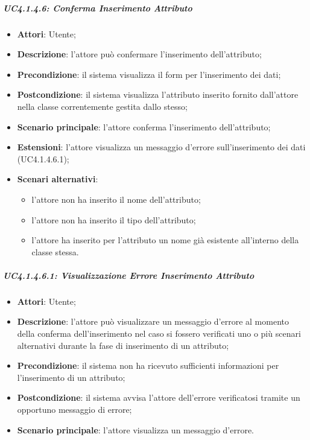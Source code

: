 \subparagraph{UC4.1.4.6: Conferma Inserimento Attributo}
\label{UC4.1.4.6}
\begin{itemize}
\item \textbf{Attori}: Utente;
\item \textbf{Descrizione}: l'attore può confermare l'inserimento dell'attributo;
\item \textbf{Precondizione}: il sistema visualizza il form per l'inserimento dei dati;	
\item \textbf{Postcondizione}: il sistema visualizza l'attributo inserito fornito dall'attore nella classe correntemente gestita dallo stesso;	
\item \textbf{Scenario principale}:
l'attore conferma l'inserimento dell'attributo;	
\item \textbf{Estensioni}:
l'attore visualizza un messaggio d'errore sull'inserimento dei dati (UC4.1.4.6.1);	
\item \textbf{Scenari alternativi}:
\begin{itemize}
	\item l'attore non ha inserito il nome dell'attributo;
	\item l'attore non ha inserito il tipo dell'attributo;
	\item l'attore ha inserito per l'attributo un nome già esistente all'interno della classe stessa.
\end{itemize}
\end{itemize}

\subparagraph{UC4.1.4.6.1: Visualizzazione Errore Inserimento Attributo}
\label{UC4.1.4.6.1}
\begin{itemize}
\item \textbf{Attori}: Utente;
\item \textbf{Descrizione}: l'attore può visualizzare un messaggio d'errore al momento della conferma dell'inserimento nel caso si fossero verificati uno o più scenari alternativi durante la fase di inserimento di un attributo;	
\item \textbf{Precondizione}: il sistema non ha ricevuto sufficienti informazioni per l'inserimento di un attributo;	
\item \textbf{Postcondizione}: il sistema avvisa l'attore dell'errore verificatosi tramite un opportuno messaggio di errore;	
\item \textbf{Scenario principale}:
l'attore visualizza un messaggio d'errore.	
\end{itemize}

